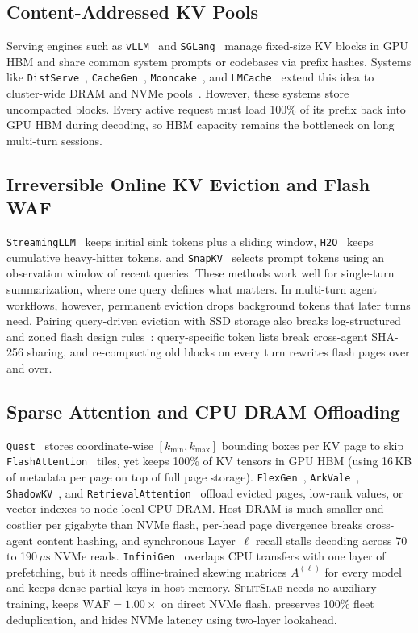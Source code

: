\documentclass[pdflatex,sn-mathphys-num]{sn-jnl}
\theoremstyle{thmstyleone}
\newcommand{\SplitSlab}{\textsc{SplitSlab}}
\newcommand{\WAF}{\mathrm{WAF}}
\begin{document}
\subsection{Content-Addressed KV Pools}
Serving engines such as \texttt{vLLM}~\cite{kwon2023vllm} and \texttt{SGLang}~\cite{zheng2024sglang} manage fixed-size KV blocks in GPU HBM and share common system prompts or codebases via prefix hashes. Systems like \texttt{DistServe}~\cite{zhong2024distserve}, \texttt{CacheGen}~\cite{liu2024cachegen}, \texttt{Mooncake}~\cite{qin2025mooncake}, and \texttt{LMCache}~\cite{cheng2025lmcache} extend this idea to cluster-wide DRAM and NVMe pools~\cite{quinlan2002venti}. However, these systems store uncompacted blocks. Every active request must load 100\% of its prefix back into GPU HBM during decoding, so HBM capacity remains the bottleneck on long multi-turn sessions.

\subsection{Irreversible Online KV Eviction and Flash WAF}
\texttt{StreamingLLM}~\cite{xiao2024streamingllm} keeps initial sink tokens plus a sliding window, \texttt{H2O}~\cite{zhang2023h2o} keeps cumulative heavy-hitter tokens, and \texttt{SnapKV}~\cite{li2024snapkv} selects prompt tokens using an observation window of recent queries. These methods work well for single-turn summarization, where one query defines what matters. In multi-turn agent workflows, however, permanent eviction drops background tokens that later turns need. Pairing query-driven eviction with SSD storage also breaks log-structured and zoned flash design rules~\cite{rosenblum1992lfs,hu2009waf,bjorling2021zns}: query-specific token lists break cross-agent SHA-256 sharing, and re-compacting old blocks on every turn rewrites flash pages over and over.

\subsection{Sparse Attention and CPU DRAM Offloading}
\texttt{Quest}~\cite{tang2024quest} stores coordinate-wise $[k_{\min}, k_{\max}]$ bounding boxes per KV page to skip \texttt{FlashAttention}~\cite{dao2022flashattention} tiles, yet keeps 100\% of KV tensors in GPU HBM (using 16\,KB of metadata per page on top of full page storage). \texttt{FlexGen}~\cite{sheng2023flexgen}, \texttt{ArkVale}~\cite{chen2024arkvale}, \texttt{ShadowKV}~\cite{sun2025shadowkv}, and \texttt{RetrievalAttention}~\cite{liu2024retrievalattention} offload evicted pages, low-rank values, or vector indexes to node-local CPU DRAM. Host DRAM is much smaller and costlier per gigabyte than NVMe flash, per-head page divergence breaks cross-agent content hashing, and synchronous Layer~$\ell$ recall stalls decoding across 70 to 190\,$\mu\mathrm{s}$ NVMe reads. \texttt{InfiniGen}~\cite{lee2024infinigen} overlaps CPU transfers with one layer of prefetching, but it needs offline-trained skewing matrices $A^{(\ell)}$ for every model and keeps dense partial keys in host memory. \SplitSlab{} needs no auxiliary training, keeps $\WAF = 1.00\times$ on direct NVMe flash, preserves 100\% fleet deduplication, and hides NVMe latency using two-layer lookahead.
\end{document}

